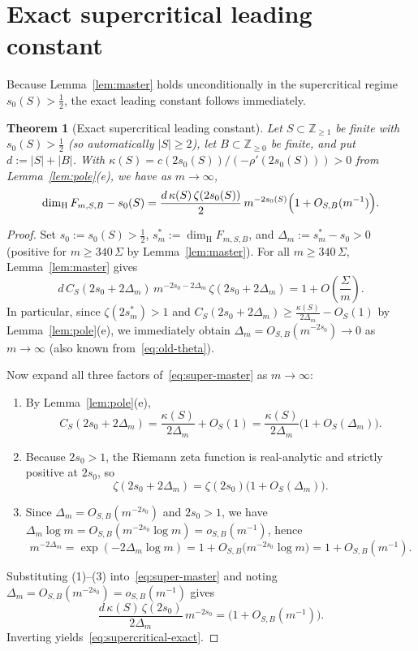 \documentclass[11pt]{article}
\newtheorem{theorem}{Theorem}[section]
\theoremstyle{definition}
\theoremstyle{remark}
\newcommand{\Z}{\mathbb{Z}}
\newcommand{\dimH}{\dim_{\mathrm{H}}}
\begin{document}
\section{Exact supercritical leading constant}\label{sec:supercritical}

Because Lemma~\ref{lem:master} holds unconditionally in the supercritical
regime $s_0(S)>\frac12$, the exact leading constant follows immediately.

\begin{theorem}[Exact supercritical leading constant]\label{thm:supercritical-exact}
Let $S\subset\Z_{\ge1}$ be finite with $s_0(S)>\frac12$ (so automatically
$|S|\ge2$), let $B\subset\Z_{\ge0}$ be finite, and put $d:=|S|+|B|$. With
$\kappa(S)=c(2s_0(S))/(-\rho'(2s_0(S)))>0$ from Lemma~\ref{lem:pole}\textup{(e)},
we have as $m\to\infty$,
\begin{equation}\label{eq:supercritical-exact}
\dimH F_{m,S,B}-s_0(S)
=\frac{d\,\kappa(S)\,\zeta(2s_0(S))}{2}\,m^{-2s_0(S)}
\Bigl(1+O_{S,B}(m^{-1})\Bigr).
\end{equation}
\end{theorem}

\begin{proof}
Set $s_0:=s_0(S)>\frac12$, $s_m^*:=\dimH F_{m,S,B}$, and
$\Delta_m:=s_m^*-s_0>0$ (positive for $m\ge 340\,\Sigma$ by
Lemma~\ref{lem:master}). For all $m\ge 340\,\Sigma$, Lemma~\ref{lem:master}
gives
\begin{equation}\label{eq:super-master}
d\,C_S(2s_0+2\Delta_m)\,m^{-2s_0-2\Delta_m}\,\zeta(2s_0+2\Delta_m)
=1+O\!\left(\frac{\Sigma}{m}\right).
\end{equation}
In particular, since $\zeta(2s_m^*)>1$ and $C_S(2s_0+2\Delta_m)\ge\frac{\kappa(S)}{2\Delta_m}-O_S(1)$
by Lemma~\ref{lem:pole}(e), we immediately obtain $\Delta_m=O_{S,B}(m^{-2s_0})\to0$
as $m\to\infty$ (also known from~\eqref{eq:old-theta}).

Now expand all three factors of~\eqref{eq:super-master} as $m\to\infty$:
\begin{enumerate}[label=\textup{(\arabic*)},leftmargin=2.2em]
\item By Lemma~\ref{lem:pole}(e),
\[
C_S(2s_0+2\Delta_m)=\frac{\kappa(S)}{2\Delta_m}+O_S(1)
=\frac{\kappa(S)}{2\Delta_m}\bigl(1+O_S(\Delta_m)\bigr).
\]
\item Because $2s_0>1$, the Riemann zeta function is real-analytic and
strictly positive at $2s_0$, so
\[
\zeta(2s_0+2\Delta_m)=\zeta(2s_0)\bigl(1+O_S(\Delta_m)\bigr).
\]
\item Since $\Delta_m=O_{S,B}(m^{-2s_0})$ and $2s_0>1$, we have
$\Delta_m\log m=O_{S,B}(m^{-2s_0}\log m)=o_{S,B}(m^{-1})$, hence
\[
m^{-2\Delta_m}=\exp(-2\Delta_m\log m)
=1+O_{S,B}\bigl(m^{-2s_0}\log m\bigr)
=1+O_{S,B}(m^{-1}).
\]
\end{enumerate}
Substituting (1)--(3) into~\eqref{eq:super-master} and noting
$\Delta_m=O_{S,B}(m^{-2s_0})=o_{S,B}(m^{-1})$ gives
\[
\frac{d\,\kappa(S)\,\zeta(2s_0)}{2\Delta_m}\,m^{-2s_0}
=\bigl(1+O_{S,B}(m^{-1})\bigr).
\]
Inverting yields~\eqref{eq:supercritical-exact}.
\end{proof}
\end{document}
